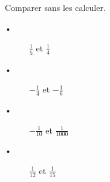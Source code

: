 
Comparer sans les calculer.
\begin{description}
\item[•] $\frac{1}{5}$ et $\frac{1}{4}$
\item[•] $-\frac{1}{4}$ et $-\frac{1}{6}$
\item[•] $-\frac{1}{10}$ et $\frac{1}{1000}$
\item[•] $\frac{1}{12}$ et $\frac{1}{15}$
\end{description}